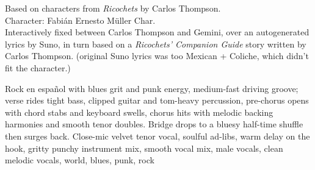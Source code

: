 

\begin{notes}
Based on characters from \emph{Ricochets} by Carlos Thompson.\\
Character: Fabián Ernesto Müller Char.\\
Interactively fixed between Carlos Thompson and Gemini, over an autogenerated lyrics by Suno, in turn based on a \emph{Ricochets' Companion Guide} story written by Carlos Thompson. %
(original Suno lyrics was too Mexican + Coliche, which didn't fit the character.)
\end{notes}

\begin{style}
Rock en español with blues grit and punk energy, medium-fast driving groove; verse rides tight bass, clipped guitar and tom-heavy percussion, pre-chorus opens with chord stabs and keyboard swells, chorus hits with melodic backing harmonies and smooth tenor doubles. %
Bridge drops to a bluesy half-time shuffle then surges back. %
Close-mic velvet tenor vocal, soulful ad-libs, warm delay on the hook, gritty punchy instrument mix, smooth vocal mix, male vocals, clean melodic vocals, world, blues, punk, rock
\end{style}


